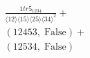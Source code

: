\documentclass[varwidth, border=5pt]{standalone}
\begin{document}
\begin{my}
$\begin{gathered}
\scriptscriptstyle\frac{1tr5_{1234}}{⟨12⟩⟨15⟩⟨25⟩⟨34⟩^2}+\\
\scriptscriptstyle(12453,\;\text{False})+\\
\scriptscriptstyle(12534,\;\text{False})\phantom{+}
\end{gathered}$
\end{my}
\end{document}
